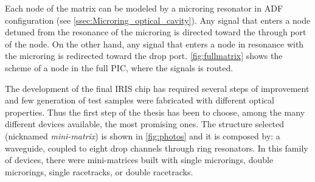 Each node of the matrix can be modeled by a microring resonator in \acs{ADF} configuration (see \autoref{ssec:Microring_optical_cavity}).
Any signal that enters a node detuned from the resonance of the microring is directed toward the through port of the node.
On the other hand, any signal that enters a node in resonance with the microring is redirected toward the drop port.
\autoref{fig:fullmatrix} shows the scheme of a node in the full \acs{PIC}, where the signals is routed.


\newpage
The development of the final IRIS chip has required several steps of improvement and few generation of test samples were fabricated with different optical properties.
Thus the first step of the thesis has been to choose, among the many different devices available, the most promising ones.
The structure selected (nicknamed \textit{mini-matrix}) is shown in \autoref{fig:photos} and it is composed by: a waveguide, coupled to eight drop channels through ring resonators.
In this family of devices, there were mini-matrices built with single microrings, double microrings, single racetracks, or double racetracks.

